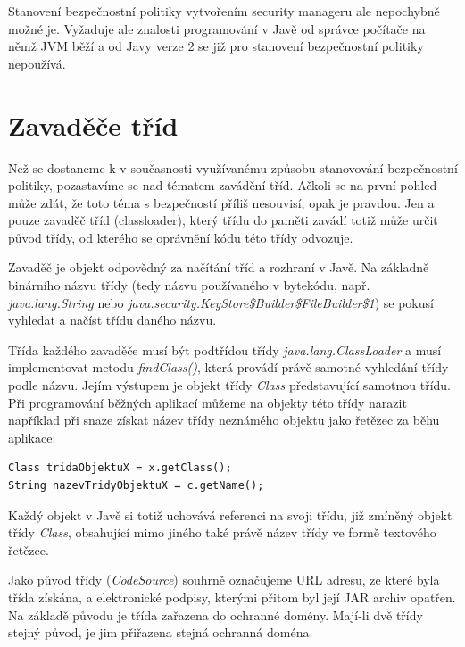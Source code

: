 Stanovení bezpečnostní politiky vytvořením security manageru ale nepochybně možné je. Vyžaduje ale znalosti programování v Javě od správce počítače na němž JVM běží a od Javy verze 2 se již pro stanovení bezpečnostní politiky nepoužívá.

\section{Zavaděče tříd}

Než se dostaneme k v současnosti využívanému způsobu stanovování bezpečnostní politiky, pozastavíme se nad tématem zavádění tříd.
Ačkoli se na první pohled může zdát, že toto téma s bezpečností příliš nesouvisí, opak je pravdou.
Jen a pouze zavaděč tříd (classloader), který třídu do paměti zavádí totiž může určit původ třídy, od kterého se oprávnění kódu této třídy odvozuje.

Zavaděč je objekt odpovědný za načítání tříd a rozhraní v Javě. Na základně binárního názvu třídy (tedy názvu používaného v bytekódu, např. {\it java.lang.String} nebo {\it java.security.KeyStore\$Builder\$FileBuilder\$1}) se pokusí vyhledat a načíst třídu daného názvu. \cite{refClassLoader}

Třída každého zavaděče musí být podtřídou třídy {\it java.lang.ClassLoader} a musí implementovat metodu {\it findClass()}, která provádí právě samotné vyhledání třídy podle názvu. Jejím výstupem je objekt třídy {\it Class} představující samotnou třídu. Při programování běžných aplikací můžeme na objekty této třídy narazit například při snaze získat název třídy neznámého objektu jako řetězec za běhu aplikace: \cite{refClassLoader}

\begin{verbatim}
Class tridaObjektuX = x.getClass();
String nazevTridyObjektuX = c.getName();
\end{verbatim}

Každý objekt v Javě si totiž uchovává referenci na svoji třídu, již zmíněný objekt třídy {\it Class}, obsahující mimo jiného také právě název třídy ve formě textového řetězce.

Jako původ třídy ({\it CodeSource}) souhrně označujeme URL adresu, ze které byla třída získána, a elektronické podpisy, kterými přitom byl její JAR archiv opatřen.
Na základě původu je třída zařazena do ochranné domény. Mají-li dvě třídy stejný původ, je jim přiřazena stejná ochranná doména. \cite[5.1]{oaks}\cite{sourceSecureClassLoader}

